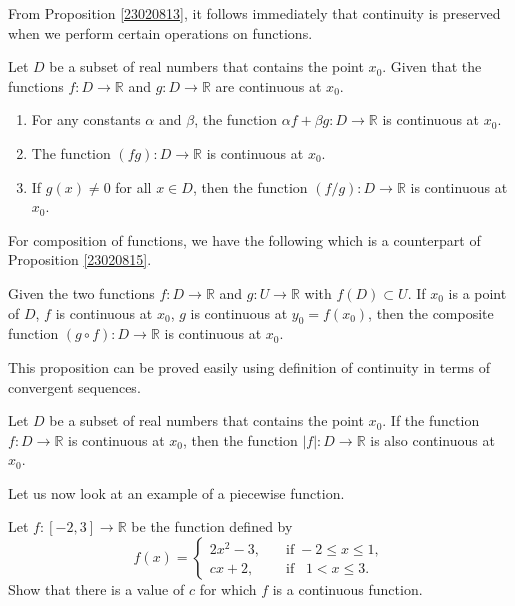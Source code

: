  From Proposition \ref{23020813}, it follows immediately that continuity is preserved when we perform certain operations on functions.
  \begin{proposition}[label=23020814]{}
Let $D$ be a subset of real numbers that contains the point $x_0$. Given that the functions $f:D\rightarrow\mathbb{R}$ and $g:D\rightarrow\mathbb{R}$ are  continuous at $x_0$.
\begin{enumerate}[1.]
\item
For any constants $\alpha$ and $\beta$, the function $\alpha f+\beta g: D\rightarrow\mathbb{R}$ is continuous at $x_0$.
\item The function $(f  g):D\rightarrow\mathbb{R}$ is continuous at $x_0$. 
\item If  $g(x)\neq 0$ for all $x\in D$,  
then the function $(f/g):D\rightarrow\mathbb{R}$ is continuous at $x_0$.
\end{enumerate}
 \end{proposition}
 
 For composition of functions, we have the following which is a counterpart of Proposition \ref{23020815}.
 \begin{proposition}[label=23020816]{}
Given the two functions $f:D\rightarrow \mathbb{R}$ and $g: U\rightarrow\mathbb{R}$ with $f(D)\subset U$. If $x_0$ is a  point of $D$,  $f$ is continuous at $x_0$, $g$ is continuous at $y_0=f(x_0)$, then
the composite function $(g\circ f):D\rightarrow \mathbb{R}$ is continuous at $x_0$.
\end{proposition}
This proposition can be proved easily using definition of continuity in terms of convergent sequences.

\begin{corollary}{}
Let $D$ be a subset of real numbers that contains the point $x_0$. If the function $f:D\rightarrow \mathbb{R}$ is continuous at $x_0$, then the function $|f|:D\rightarrow \mathbb{R}$ is also continuous at $x_0$.
\end{corollary}

Let us now look at an example of a piecewise function.
\begin{example}[label=23020902]{}
Let $f:[-2,3]\rightarrow\mathbb{R}$ be the function defined by
\[f(x)=\begin{cases} 2x^2-3,\quad &\text{if}\;-2\leq x\leq 1,\\
cx+2,\quad &\text{if}\;\;\;1<x\leq 3.\end{cases}\]
Show that there is a value of $c$ for which $f$ is a continuous function.
\end{example}


